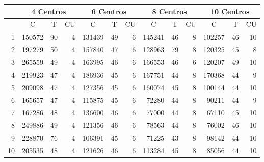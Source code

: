 \documentclass{article}
\begin{document}
  \begin{center}
    \begin{tabular}{ | r | r | r | r | r | r | r | r | r | r | r | r | r | }
      \hline
      \rowcolor{DarkGrey}
      & \multicolumn{3}{|c|}{4 Centros} & \multicolumn{3}{c|}{6 Centros} & \multicolumn{3}{|c|}{8 Centros} & \multicolumn{3}{|c|}{10 Centros} \\ \hline
      \rowcolor{DarkGrey}
      \multicolumn{1}{|c|}{Réplica} & \multicolumn{1}{|c|}{C} & \multicolumn{1}{|c|}{T} & \multicolumn{1}{|c|}{CU} & \multicolumn{1}{|c|}{C} & \multicolumn{1}{|c|}{T} & \multicolumn{1}{|c|}{CU} & \multicolumn{1}{|c|}{C} & \multicolumn{1}{|c|}{T} & \multicolumn{1}{|c|}{CU} & \multicolumn{1}{|c|}{C} & \multicolumn{1}{|c|}{T} & \multicolumn{1}{|c|}{CU} \\ \hline \hline
      1 & 150572 & 90 & 4 & 131439 & 49 & 6 & 145241 & 46 & 8 & 102257 & 46 & 10 \\ \hline
      \rowcolor{LightGrey}
      2 & 197279 & 50 & 4 & 157840 & 47 & 6 & 128963 & 79 & 8 & 120325 & 45 & 8 \\ \hline
      3 & 265559 & 49 & 4 & 163995 & 46 & 6 & 166553 & 46 & 6 & 120207 & 49 & 10 \\ \hline
      \rowcolor{LightGrey}
      4 & 219923 & 47 & 4 & 186936 & 45 & 6 & 167751 & 44 & 8 & 170368 & 44 & 9\\ \hline
      5 & 209098 & 47 & 4 & 127356 & 45 & 6 & 160074 & 45 & 8 & 100144 & 44 & 10 \\ \hline
      \rowcolor{LightGrey}
      6 & 165657 & 47 & 4 & 115875 & 45 & 6 & 72280 & 44 & 8 & 90211 & 44 & 9 \\ \hline
      7 & 167286 & 48 & 4 & 136600 & 46 & 6 & 77000 & 44 & 8 & 67110 & 45 & 10 \\ \hline
      \rowcolor{LightGrey}
      8 & 249886 & 49 & 4 & 121356 & 46 & 6 & 78563 & 44 & 8 & 76002 & 46 & 10 \\ \hline
      9 & 228870 & 76 & 4 & 106391 & 45 & 6 & 71225 & 43 & 8 & 98142 & 44 & 10 \\ \hline
      \rowcolor{LightGrey}
      10 & 205535 & 48 & 4 & 121626 & 46 & 6 & 113284 & 45 & 8 & 85056 & 44 & 10\\ \hline
    \end{tabular}
    \label{table:T4}
  \end{center}
\end{document}
